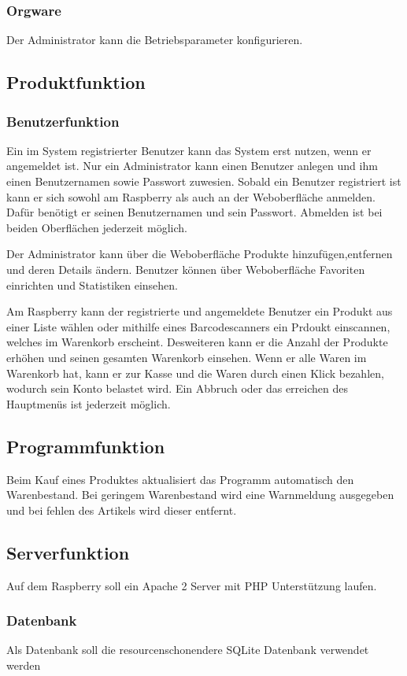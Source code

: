 \documentclass[11pt,a4paper]{article} %
\begin{document}
\subsubsection{Orgware}
Der Administrator kann die Betriebsparameter konfigurieren.

\subsection{Produktfunktion}
\subsubsection{Benutzerfunktion}
Ein im System registrierter Benutzer kann das System erst nutzen, wenn er angemeldet ist.
Nur ein Administrator kann einen Benutzer anlegen und ihm einen Benutzernamen sowie Passwort zuwesien. Sobald ein Benutzer registriert ist kann er sich sowohl am Raspberry als auch an der Weboberfläche anmelden. Dafür benötigt er seinen Benutzernamen und sein Passwort. Abmelden ist bei beiden Oberflächen jederzeit möglich.
\par
Der Administrator kann über die Weboberfläche Produkte hinzufügen,entfernen und deren Details ändern. Benutzer können über Weboberfläche Favoriten einrichten und Statistiken einsehen.
\par
Am Raspberry kann der registrierte und angemeldete Benutzer ein Produkt aus einer Liste wählen oder mithilfe eines Barcodescanners ein Prdoukt einscannen, welches im Warenkorb erscheint. Desweiteren kann er die Anzahl der Produkte erhöhen und seinen gesamten Warenkorb einsehen. Wenn er alle Waren im Warenkorb hat, kann er zur Kasse und die Waren durch einen Klick bezahlen, wodurch sein Konto belastet wird. Ein Abbruch oder das erreichen des Hauptmenüs ist jederzeit möglich.

\subsection{Programmfunktion}
Beim Kauf eines Produktes aktualisiert das Programm automatisch den Warenbestand. Bei geringem Warenbestand wird eine Warnmeldung ausgegeben und bei fehlen des Artikels wird dieser entfernt.

\subsection{Serverfunktion}
Auf dem Raspberry soll ein Apache 2 Server mit PHP Unterstützung laufen.
\subsubsection{Datenbank}
Als Datenbank soll die resourcenschonendere SQLite Datenbank verwendet werden
\end{document}
